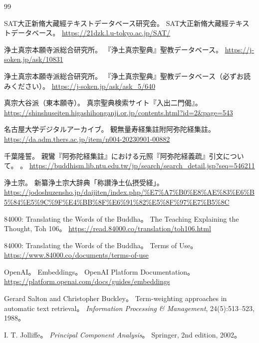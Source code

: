 \documentclass[uplatex,dvipdfmx,11pt,a4paper]{jsarticle}
\begin{document}
\begin{thebibliography}{99}

SAT大正新脩大藏經テキストデータベース研究会。
\newblock SAT大正新脩大藏經テキストデータベース。
\newblock \url{https://21dzk.l.u-tokyo.ac.jp/SAT/}

浄土真宗本願寺派総合研究所。
\newblock 『浄土真宗聖典』聖教データベース。
\newblock \url{https://j-soken.jp/ask/10831}

浄土真宗本願寺派総合研究所。
\newblock 『浄土真宗聖典』聖教データベース（必ずお読みください）。
\newblock \url{https://j-soken.jp/ask/ask_5/640}

真宗大谷派（東本願寺）。
\newblock 真宗聖典検索サイト『入出二門偈』。
\newblock \url{https://shinshuseiten.higashihonganji.or.jp/contents.html?id=2&page=543}

名古屋大学デジタルアーカイブ。
\newblock 観無量寿経集註附阿弥陀経集註。
\newblock \url{https://da.adm.thers.ac.jp/item/n004-20230901-00882}

千葉隆誓。
\newblock 親鸞『阿弥陀経集註』における元照『阿弥陀経義疏』引文について。
。
\newblock \url{https://buddhism.lib.ntu.edu.tw/jp/search/search_detail.jsp?seq=546211}

浄土宗。
\newblock 新纂浄土宗大辞典「称讃浄土仏摂受経」。
\newblock \url{https://jodoshuzensho.jp/daijiten/index.php/%E7%A7%B0%E8%AE%83%E6%B5%84%E5%9C%9F%E4%BB%8F%E6%91%82%E5%8F%97%E7%B5%8C}

84000: Translating the Words of the Buddha。
\newblock The Teaching Explaining the Thought, Toh 106。
\newblock \url{https://read.84000.co/translation/toh106.html}

84000: Translating the Words of the Buddha。
\newblock Terms of Use。
\newblock \url{https://www.84000.co/documents/terms-of-use}

OpenAI。
\newblock Embeddings。
\newblock OpenAI Platform Documentation。
\newblock \url{https://platform.openai.com/docs/guides/embeddings}

Gerard Salton and Christopher Buckley。
\newblock Term-weighting approaches in automatic text retrieval。
\newblock \textit{Information Processing \& Management}, 24(5):513--523, 1988。

I. T. Jolliffe。
\newblock \textit{Principal Component Analysis}。
\newblock Springer, 2nd edition, 2002。


\end{thebibliography}
\end{document}
